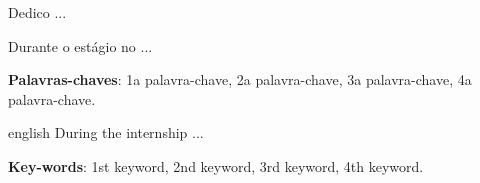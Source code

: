 \begin{agradecimentos}

    Dedico ...
    
\end{agradecimentos}



\setlength{\absparsep}{18pt} %
\begin{resumo}
	
    Durante o estágio no ... 
    
	\vspace{\onelineskip}
 
	\noindent 
	\textbf{Palavras-chaves}: 1a palavra-chave, 2a palavra-chave, 3a palavra-chave, 4a palavra-chave.
\end{resumo}

\begin{resumo}[Abstract]
\begin{otherlanguage*}{english}
    During the internship ...
    
	\vspace{\onelineskip}
 
	\noindent 
	\textbf{Key-words}: 1st keyword, 2nd keyword, 3rd keyword, 4th keyword.
\end{otherlanguage*}
\end{resumo}

